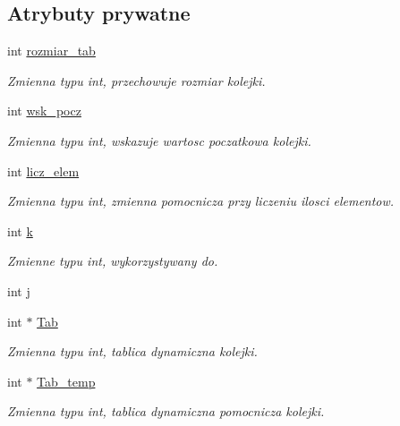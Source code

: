 \subsection*{\-Atrybuty prywatne}
\begin{DoxyCompactItemize}
\item 
int \hyperlink{class_kolejka_a72ba80c6ad16d9e2f5a8a02ec257524b}{rozmiar\-\_\-tab}
\begin{DoxyCompactList}\small\item\em \-Zmienna typu int, przechowuje rozmiar kolejki. \end{DoxyCompactList}\item 
int \hyperlink{class_kolejka_a9fc9f63fded5c275d32f8b05125e8428}{wsk\-\_\-pocz}
\begin{DoxyCompactList}\small\item\em \-Zmienna typu int, wskazuje wartosc poczatkowa kolejki. \end{DoxyCompactList}\item 
int \hyperlink{class_kolejka_a563cd8e3ecaf570a6f8068db62d6c099}{licz\-\_\-elem}
\begin{DoxyCompactList}\small\item\em \-Zmienna typu int, zmienna pomocnicza przy liczeniu ilosci elementow. \end{DoxyCompactList}\item 
int \hyperlink{class_kolejka_a859e9504347a642ed42c65d1aadee0a1}{k}
\begin{DoxyCompactList}\small\item\em \-Zmienne typu int, wykorzystywany do. \end{DoxyCompactList}\item 
int \hyperlink{class_kolejka_a7eef5cf96ca7f8178dfc9ae5ad02417d}{j}
\item 
int $\ast$ \hyperlink{class_kolejka_adfbcda2500bf9d82a22d8d717ee6f695}{\-Tab}
\begin{DoxyCompactList}\small\item\em \-Zmienna typu int, tablica dynamiczna kolejki. \end{DoxyCompactList}\item 
int $\ast$ \hyperlink{class_kolejka_a5ec5307ce26f31ae9c29f91bd7527225}{\-Tab\-\_\-temp}
\begin{DoxyCompactList}\small\item\em \-Zmienna typu int, tablica dynamiczna pomocnicza kolejki. \end{DoxyCompactList}\end{DoxyCompactItemize}



